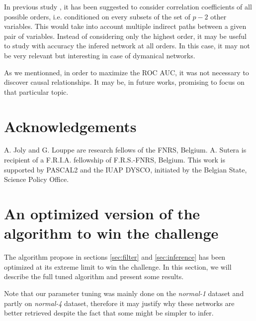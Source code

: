 \documentclass[wcp]{jmlr}
\begin{document}
In previous study \citep{shipley2002cause}, it has been suggested to
consider correlation coefficients of all possible orders,
i.e. conditioned on every subsets of the set of $p-2$ other variables. This
would take into account multiple indirect paths between a given pair of
variables. Instead of considering only the highest order, it may be useful to
study with accuracy the infered network at all orders. In this case, it may not
be very relevant but interesting in case of dymanical networks.

As we mentionned, in order to maximize the ROC AUC, it was not necessary to
discover causal relationships. It may be, in future works, promising to focus
on that particular topic.


\section*{Acknowledgements}
A. Joly and G. Louppe are research fellows of
the FNRS, Belgium.  A. Sutera is recipient of
a F.R.I.A. fellowship of F.R.S.-FNRS, Belgium.
This work is supported by PASCAL2 and the IUAP DYSCO, initiated by the
Belgian State, Science Policy Office.



\newpage
\clearpage



\newpage
\clearpage

\appendix


\section{An optimized version of the algorithm to win the challenge}
\label{app:optimized}


The algorithm propose in sections \ref{sec:filter} and \ref{sec:inference} has been optimized at its extreme limit to win the challenge. In this section, we will describe the full tuned algorithm and present some results.

Note that our parameter tuning was mainly
done on the \textit{normal-1} dataset and partly on \textit{normal-4} dataset,
therefore it may justify why these networks are better retrieved despite the
fact that some might be simpler to infer.
\end{document}
